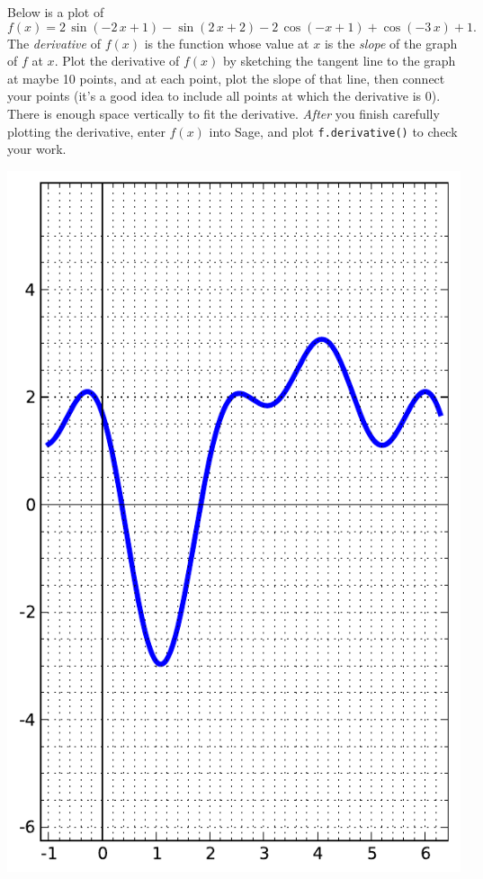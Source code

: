 Below is a plot of $$f(x)=2 \, \sin\left(-2 \, x + 1\right) - \sin\left(2 \, x + 2\right) - 2 \, \cos\left(-x + 1\right) + \cos\left(-3 \, x\right) + 1.$$  The {\em \color{red}derivative} of $f(x)$ is the function whose value at $x$ is the {\em slope} of the graph of $f$ at $x$.  Plot the derivative of $f(x)$ by sketching the tangent line to the graph at maybe 10 points, and at each point, plot the slope of that line, then connect your points (it's a good idea to include all points at which the derivative is 0).  There is enough space vertically to fit the derivative.  {\em After} you finish carefully plotting the derivative, enter $f(x)$ into Sage, and plot {\color{blue}\verb|f.derivative()|} to check your work.
\begin{center}\includegraphics{functions/82.pdf}\end{center}\newpage

